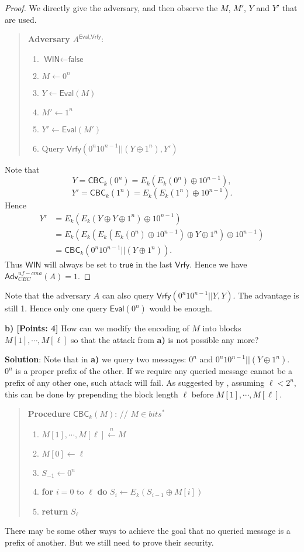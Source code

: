 \documentclass[12pt]{article}
\newcommand{\getsn}{\stackrel{n}{\gets}}
\newcommand{\Adv}{\textsf{Adv}}
\newcommand{\CBC}{\textsf{CBC}}
\newcommand{\Eval}{\textsf{Eval}}
\newcommand{\Vrfy}{\textsf{Vrfy}}
\newcommand{\WIN}{\textsf{WIN}}
\newcommand{\true}{\textsf{true}}
\newcommand{\false}{\textsf{false}}
\theoremstyle{definition}
\begin{document}
\begin{proof}
We directly give the adversary, and then observe the $M$, $M'$, $Y$ and $Y'$ that are used.
\begin{quote}
{\bf Adversary} $A^{\Eval, \Vrfy}$:
\begin{enumerate}
\item $\WIN \gets \false$
\item $M \gets 0^n$
\item $Y \gets \Eval(M)$
\item $M' \gets 1^n$
\item $Y' \gets \Eval(M')$
\item Query $\Vrfy(0^n10^{n-1}||(Y \oplus 1^n), Y')$
\end{enumerate}
\end{quote}
Note that 
$$Y = \CBC_k (0^n) = E_k(E_k(0^n) \oplus 10^{n-1}),$$
$$Y' = \CBC_k (1^n) = E_k(E_k(1^n) \oplus 10^{n-1}).$$
Hence
$$\begin{aligned}
Y' &= E_k(E_k(Y \oplus Y \oplus 1^n) \oplus 10^{n-1}) \\
&= E_k(E_k(E_k(E_k(0^n) \oplus 10^{n-1}) \oplus Y \oplus 1^n) \oplus 10^{n-1}) \\
&= \CBC_k (0^n10^{n-1} || (Y \oplus 1^n)).
\end{aligned}$$
Thus $\WIN$ will always be set to $\true$ in the last $\Vrfy$. Hence we have $\Adv_{CBC}^{uf-cma}(A) = 1$.
\end{proof}
Note that the adversary $A$ can also query $\Vrfy(0^n10^{n-1}||Y, Y)$. The advantage is still 1. Hence only one query $\Eval(0^n)$ would be enough.

{\bf b) [Points: 4]} How can we modify the encoding of $M$ into blocks
$M[1], \cdots, M[\ell]$ so that the attack from {\bf a)} is not possible any more?

{\bf Solution}: Note that in {\bf a)} we query two messages: $0^n$ and $0^n10^{n-1}||(Y \oplus 1^n)$. $0^n$ is a proper prefix of the other. If we require any queried message cannot be a prefix of any other one, such attack will fail. As suggested by \cite{BKR94}, assuming $\ell < 2^n$, this can be done by prepending the block length $\ell$ before $M[1], \cdots, M[\ell]$.
\begin{quote}
{\bf Procedure} $\CBC_k (M)$: // $M \in bits^*$
\begin{enumerate}
\item $M[1], \cdots, M[\ell] \getsn M$
\item $M[0] \gets \ell$
\item $S_{-1} \gets 0^n$
\item {\bf for} $i=0$ to $\ell$ {\bf do} $S_i \gets E_k (S_{i-1} \oplus M[i])$
\item {\bf return} $S_{\ell}$
\end{enumerate}
\end{quote}
There may be some other ways to achieve the goal that no queried message is a prefix of another. But we still need to prove their security.
\end{document}
